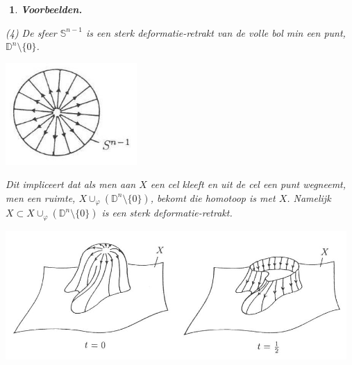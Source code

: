 \documentclass[12pt]{book}
\newcommand{\R}{\mathbb{R}}
\newtheorem{vbnh}[stelh]{$\!\!$}
\newenvironment{vbn}{\begin{vbnh} \em {\bf Voorbeelden.}}{\end{vbnh}}
\newtheorem{dfh}[stelh]{$\!\!$}
\newenvironment{df}{\begin{dfh} \em {\bf Definitie }}{\end{dfh}}
\begin{document}
\begin{vbn}
%
%
%
%



(4) De sfeer $\mathbb{S}^{n-1}$ is een sterk deformatie-retrakt van de volle bol min een punt, $\mathbb{D}^{n}\setminus\{0\}$.

\begin{center}
\includegraphics[width=5cm]{images/diskminpt.JPG}
\end{center}

Dit impliceert dat als men aan $X$ een cel kleeft en uit de cel een punt wegneemt, men een ruimte, $X\cup_{\varphi} (\mathbb{D}^{n}\setminus\{0\})$, bekomt die homotoop is met $X$. Namelijk $X\subset X\cup_{\varphi} (\mathbb{D}^{n}\setminus\{0\})$ is een sterk deformatie-retrakt.

\begin{center}
\includegraphics[width=13cm]{images/retrakt.JPG}
\end{center}




\end{vbn}
\end{document}
